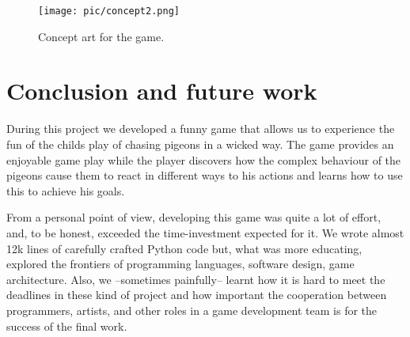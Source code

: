 \documentclass[a4paper,10pt]{article}
\begin{document}
\begin{figure}[h!]
  \centering
  \texttt{[image: pic/concept2.png]}
  \caption{Concept art for the game.}
  \label{pic:jp}
\end{figure}

\section{Conclusion and future work}

During this project we developed a funny game that allows us to
experience the fun of the childs play of chasing pigeons in a wicked
way. The game provides an enjoyable game play while the player
discovers how the complex behaviour of the pigeons cause them to react
in different ways to his actions and learns how to use this to achieve
his goals.

From a personal point of view, developing this game was quite a lot of
effort, and, to be honest, exceeded the time-investment expected for
it. We wrote almost 12k lines of carefully crafted Python code but,
what was more educating, explored the frontiers of programming
languages, software design, game architecture. Also, we --sometimes
painfully-- learnt how it is hard to meet the deadlines in these kind
of project and how important the cooperation between programmers,
artists, and other roles in a game development team is for
the success of the final work.
\end{document}
